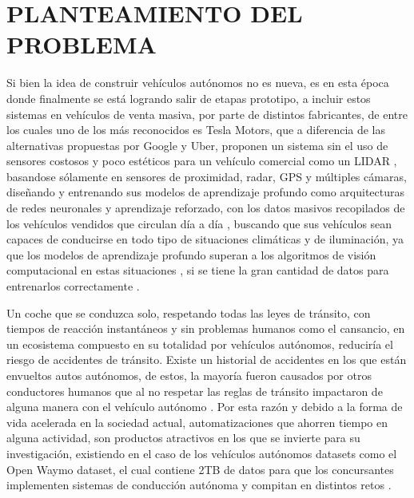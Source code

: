 \section{PLANTEAMIENTO DEL PROBLEMA}
Si bien la idea de construir vehículos autónomos no es nueva, es en esta época donde finalmente se está logrando salir de etapas prototipo, a incluir estos sistemas en vehículos de venta masiva, por parte de distintos fabricantes, de entre los cuales uno de los más reconocidos es Tesla Motors, que a diferencia de las alternativas propuestas por Google y Uber, proponen un sistema sin el uso de sensores costosos y poco estéticos para un vehículo comercial como un LIDAR \citep{granath_2020}, basandose sólamente en sensores de proximidad, radar, GPS y múltiples cámaras, diseñando y entrenando sus modelos de aprendizaje profundo como arquitecturas de redes neuronales y aprendizaje reforzado, con los datos masivos recopilados de los vehículos vendidos que circulan día a día \citep{karpathy-scaledml}, buscando que sus vehículos sean capaces de conducirse en todo tipo de situaciones climáticas y de iluminación, ya que los modelos de aprendizaje profundo superan a los algoritmos de visión computacional en estas situaciones \citep{Goodfellow-et-al-2016}, si se tiene la gran cantidad de datos para entrenarlos correctamente \citep{alexnet}.

Un coche que se conduzca solo, respetando todas las leyes de tránsito, con tiempos de reacción instantáneos y sin problemas humanos como el cansancio, en un ecosistema compuesto en su totalidad por vehículos autónomos, reduciría el riesgo de accidentes de tránsito. Existe un historial de accidentes en los que están envueltos autos autónomos, de estos, la mayoría fueron causados por otros conductores humanos que al no respetar las reglas de tránsito impactaron de alguna manera con el vehículo autónomo \citep{wikipedia_2020}. Por esta razón y debido a la forma de vida acelerada en la sociedad actual, automatizaciones que ahorren tiempo en alguna actividad, son productos atractivos en los que se invierte para su investigación, existiendo en el caso de los vehículos autónomos datasets como el Open Waymo dataset, el cual contiene 2TB de datos para que los concursantes implementen sistemas de conducción autónoma y compitan en distintos retos \citep{waymo}.

